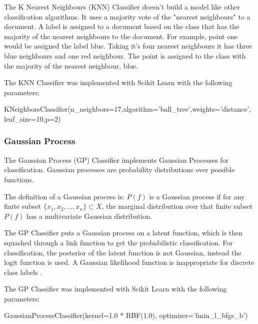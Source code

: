 The K Nearest Neighbours (KNN) Classifier doesn't build a model like other classification algorithms. It uses a majority vote of the "nearest neighbours" to a document. A label is assigned to a document based on the class that has the majority of the nearest neighbours to the document. For example, point one would be assigned the label blue. Taking it's four nearest neighbours it has three blue neighbours and one red neighbour. The point is assigned to the class with the majority of the nearest neighbour, blue.

The KNN Classifier was implemented with Scikit Learn with the following parameters:

\begin{tcolorbox}
\begin{center}
	KNeighborsClassifier(n\_neighbors=17,algorithm='ball\_tree',weights='distance',
	leaf\_size=10,p=2)
\end{center}
\end{tcolorbox}

\subsubsection*{Gaussian Process}

The Gaussian Process (GP) Classifier implements Gaussian Processes for classification. Gaussian processes are probability distributions over possible functions.

The definition of a Gaussian process is: $P(f)$ is a Gaussian process if for any finite subset $\{x_1,x_2,...,x_n\} \subset X$, the marginal distribution over that finite subset $P(f)$ has a multivariate Gaussian distribution.

The GP Classifier puts a Gaussian process on a latent function, which is then squashed through a link function to get the probabilistic classification. For classification, the posterior of the latent function is not Gaussian, instead the logit function is used. A Gaussian likelihood function is inappropriate for discrete class labels \cite{gaussianProcesses2006}.

The GP Classifier was implemented with Scikit Learn with the following parameters:

\begin{tcolorbox}
\begin{center}
	GaussianProcessClassifier(kernel=1.0 * RBF(1.0), optimizer='fmin\_l\_bfgs\_b')
\end{center}
\end{tcolorbox}

